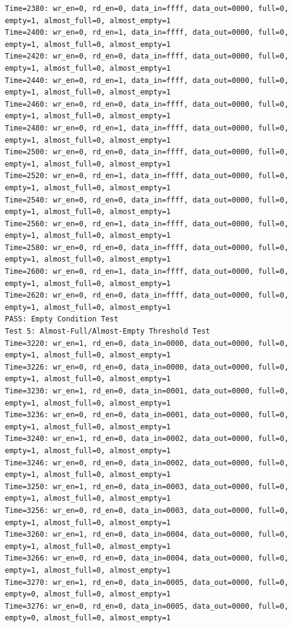 \documentclass[UTF8]{ctexart}
\begin{document}
\begin{lstlisting}[frame=shadowbox]
Time=2380: wr_en=0, rd_en=0, data_in=ffff, data_out=0000, full=0, empty=1, almost_full=0, almost_empty=1
Time=2400: wr_en=0, rd_en=1, data_in=ffff, data_out=0000, full=0, empty=1, almost_full=0, almost_empty=1
Time=2420: wr_en=0, rd_en=0, data_in=ffff, data_out=0000, full=0, empty=1, almost_full=0, almost_empty=1
Time=2440: wr_en=0, rd_en=1, data_in=ffff, data_out=0000, full=0, empty=1, almost_full=0, almost_empty=1
Time=2460: wr_en=0, rd_en=0, data_in=ffff, data_out=0000, full=0, empty=1, almost_full=0, almost_empty=1
Time=2480: wr_en=0, rd_en=1, data_in=ffff, data_out=0000, full=0, empty=1, almost_full=0, almost_empty=1
Time=2500: wr_en=0, rd_en=0, data_in=ffff, data_out=0000, full=0, empty=1, almost_full=0, almost_empty=1
Time=2520: wr_en=0, rd_en=1, data_in=ffff, data_out=0000, full=0, empty=1, almost_full=0, almost_empty=1
Time=2540: wr_en=0, rd_en=0, data_in=ffff, data_out=0000, full=0, empty=1, almost_full=0, almost_empty=1
Time=2560: wr_en=0, rd_en=1, data_in=ffff, data_out=0000, full=0, empty=1, almost_full=0, almost_empty=1
Time=2580: wr_en=0, rd_en=0, data_in=ffff, data_out=0000, full=0, empty=1, almost_full=0, almost_empty=1
Time=2600: wr_en=0, rd_en=1, data_in=ffff, data_out=0000, full=0, empty=1, almost_full=0, almost_empty=1
Time=2620: wr_en=0, rd_en=0, data_in=ffff, data_out=0000, full=0, empty=1, almost_full=0, almost_empty=1
PASS: Empty Condition Test
Test 5: Almost-Full/Almost-Empty Threshold Test
Time=3220: wr_en=1, rd_en=0, data_in=0000, data_out=0000, full=0, empty=1, almost_full=0, almost_empty=1
Time=3226: wr_en=0, rd_en=0, data_in=0000, data_out=0000, full=0, empty=1, almost_full=0, almost_empty=1
Time=3230: wr_en=1, rd_en=0, data_in=0001, data_out=0000, full=0, empty=1, almost_full=0, almost_empty=1
Time=3236: wr_en=0, rd_en=0, data_in=0001, data_out=0000, full=0, empty=1, almost_full=0, almost_empty=1
Time=3240: wr_en=1, rd_en=0, data_in=0002, data_out=0000, full=0, empty=1, almost_full=0, almost_empty=1
Time=3246: wr_en=0, rd_en=0, data_in=0002, data_out=0000, full=0, empty=1, almost_full=0, almost_empty=1
Time=3250: wr_en=1, rd_en=0, data_in=0003, data_out=0000, full=0, empty=1, almost_full=0, almost_empty=1
Time=3256: wr_en=0, rd_en=0, data_in=0003, data_out=0000, full=0, empty=1, almost_full=0, almost_empty=1
Time=3260: wr_en=1, rd_en=0, data_in=0004, data_out=0000, full=0, empty=1, almost_full=0, almost_empty=1
Time=3266: wr_en=0, rd_en=0, data_in=0004, data_out=0000, full=0, empty=1, almost_full=0, almost_empty=1
Time=3270: wr_en=1, rd_en=0, data_in=0005, data_out=0000, full=0, empty=0, almost_full=0, almost_empty=1
Time=3276: wr_en=0, rd_en=0, data_in=0005, data_out=0000, full=0, empty=0, almost_full=0, almost_empty=1

\end{lstlisting}
\end{document}
